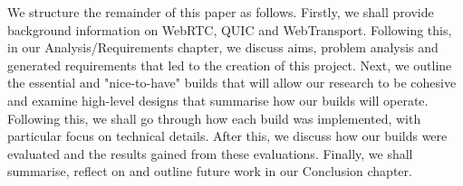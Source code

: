 


We structure the remainder of this paper as follows. Firstly, we shall provide background information on WebRTC, QUIC and WebTransport. Following this, in our Analysis/Requirements chapter, we discuss aims, problem analysis and generated requirements that led to the creation of this project. Next, we outline the essential and "nice-to-have" builds that will allow our research to be cohesive and examine high-level designs that summarise how our builds will operate. Following this, we shall go through how each build was implemented, with particular focus on technical details. After this, we discuss how our builds were evaluated and the results gained from these evaluations. Finally, we shall summarise, reflect on and outline future work in our Conclusion chapter.









